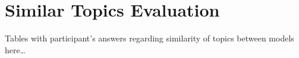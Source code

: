 \chapter{Similar Topics Evaluation}
\label{cha:similar_topics_evaluation}
Tables with participant's answers regarding similarity of topics between models here\ldots

